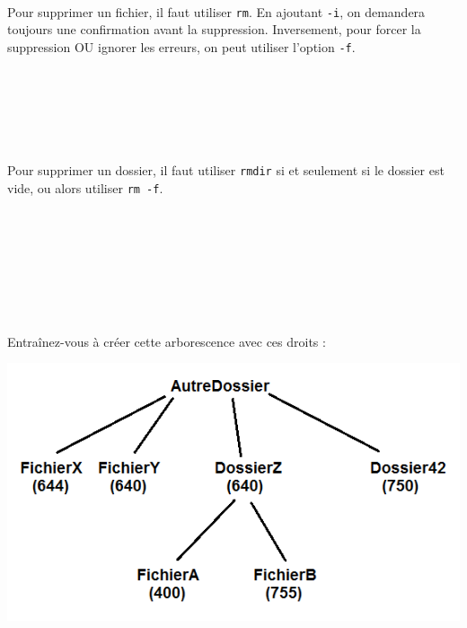 \\

Pour supprimer un fichier, il faut utiliser \texttt{rm}.
En ajoutant \texttt{-i}, on demandera toujours une confirmation avant la suppression.
Inversement, pour forcer la suppression OU ignorer les erreurs, on peut utiliser l'option \texttt{-f}.\\

\\
\\
\\
\\
\\
\\

Pour supprimer un dossier, il faut utiliser \texttt{rmdir} si et seulement si le dossier est vide, ou alors utiliser \texttt{rm -f}.\\

\\
\\
\\
\\
\\
\\
\\

\bigskip

Entraînez-vous à créer cette arborescence avec ces droits :\\

\begin{center}
\includegraphics[scale=1]{Cours/TP1-arborescence.png}
\end{center}

